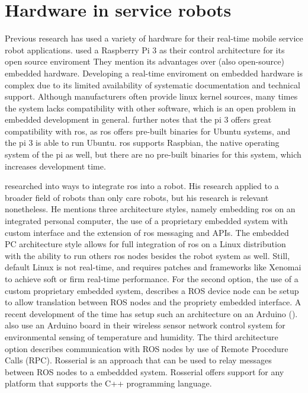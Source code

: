 \documentclass[12pt]{scrreprt}
\begin{document}
\section{Hardware in service robots}
\label{tHardware}
Previous research has used a variety of hardware for their real-time mobile service robot applications. \citeauthor{delgado} used a Raspberry Pi 3 as their control architecture for its open source enviroment They mention its advantages over (also open-source) embedded hardware. Developing a real-time enviroment on embedded hardware is complex due to its limited availability of systematic documentation and technical support. Although manufacturers often provide linux kernel sources, many times the system lacks compatibility with other software, which is an open problem in embedded development in general. \citeauthor{delgado} further notes that the \gls{pi} 3 offers great compatibility with \acrfull{ros}, as \acrshort{ros} offers pre-built binaries for Ubuntu systems, and the \gls{pi} 3 is able to run Ubuntu. \acrshort{ros} supports Raspbian, the native operating system of the \gls{pi} as well, but there are no pre-built  binaries for this system, which increases development time.
\par
\citeauthor{bouchier} researched into ways to integrate \acrshort{ros} into a robot. His research applied to a broader field of robots than only care robots, but his research is relevant nonetheless. He mentions three architecture styles, namely embedding \acrshort{ros} on an integrated personal computer, the use of a proprietary embedded system with custom interface and the extension of \acrshort{ros} messaging and APIs. The embedded PC architecture style allows for full integration of \acrshort{ros} on a Linux distribution with the ability to run others \acrshort{ros} nodes besides the robot system as well. Still, default Linux is not real-time, and requires patches and frameworks like Xenomai to achieve soft or firm real-time performance. For the second option, the use of a custom proprietary embedded system, \citeauthor{bouchier} describes a ROS device node can be setup to allow translation between ROS nodes and the propriety embedded interface. A recent development of the time has setup such an architecture on an Arduino (\cite{bouchier}). \citeauthor{arduino} also use an Arduino board in their wireless sensor network control system for environmental sensing of temperature and humidity. The third architecture  option describes communication with ROS nodes by use of Remote Procedure Calls (RPC). Rosserial is an approach that can be used to relay messages between ROS nodes to a embeddded system. Rosserial offers support for any platform that supports the C++ programming language.
\end{document}
